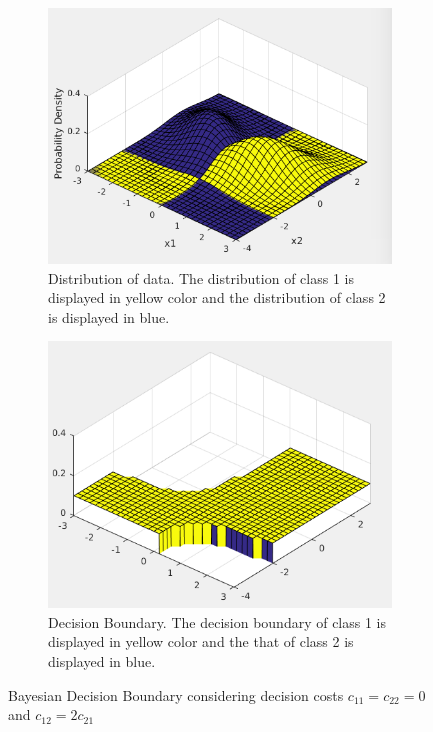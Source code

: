 \documentclass[12pt]{article}
\begin{document}
\begin{enumerate}
\begin{figure}[h]
\centering
\begin{subfigure}{0.4\textwidth}
\includegraphics[scale=0.3]{Imgs/1-2-1.png}
\caption{Distribution of data. The distribution of class 1 is displayed in yellow color and the distribution of class 2 is displayed in blue.}
\end{subfigure}
\begin{subfigure}{0.4\textwidth}
\includegraphics[scale=0.3]{Imgs/1-2-2.png}
\caption{Decision Boundary. The decision boundary of class 1 is displayed in yellow color and the that of class 2 is displayed in blue.}
\end{subfigure}
\caption{Bayesian Decision Boundary considering decision costs $c_{11} = c_{22} = 0$ and $c_12 = 2c_{21}$}
\label{fig:1-2}
\end{figure}


\end{enumerate}
\end{document}
